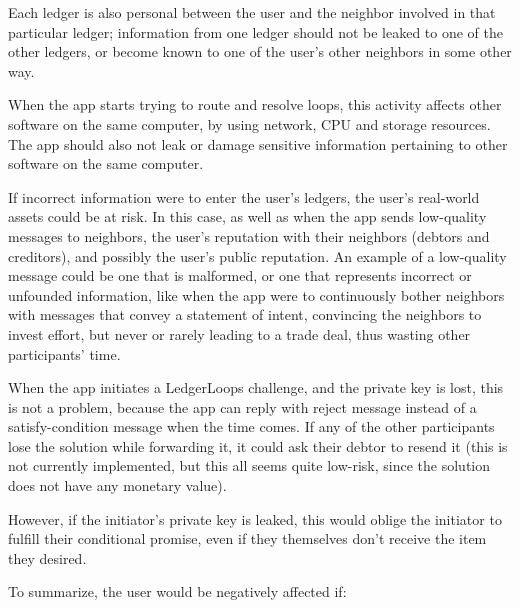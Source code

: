\documentclass[11pt,twoside,a4paper]{article}
\begin{document}
Each ledger is also personal between the user and the neighbor involved in that particular ledger; information from one ledger should not be leaked to one of the other ledgers, or become known to one of the user's other neighbors in some other way.

When the app starts trying to route and resolve loops, this activity affects other software on the same computer, by using network, CPU and storage resources. The app should also not leak or damage sensitive information pertaining to other software on the same computer.

If incorrect information were to enter the user's ledgers, the user's real-world assets could be at risk.
In this case, as well as when the app sends low-quality messages to neighbors, the user's reputation with their neighbors (debtors and creditors), and possibly the user's public reputation. An example of a low-quality message could be one that is malformed, or one that represents incorrect or unfounded information, like when the app were to continuously bother neighbors with messages that convey a statement of intent, convincing the neighbors to invest effort, but never or rarely leading to a trade deal, thus wasting other participants' time.

When the app initiates a LedgerLoops challenge, and the private key is lost, this is not a problem, because the app can reply with reject message instead of a satisfy-condition message when the time comes. If any of the other participants lose the solution while forwarding it, it could ask their debtor to resend it (this is not currently implemented, but this all seems quite low-risk, since the solution does not have any monetary value).

However, if the initiator's private key is leaked, this would oblige the initiator to fulfill their conditional promise, even if they themselves don't receive the item they desired.

To summarize, the user would be negatively affected if:
\end{document}

